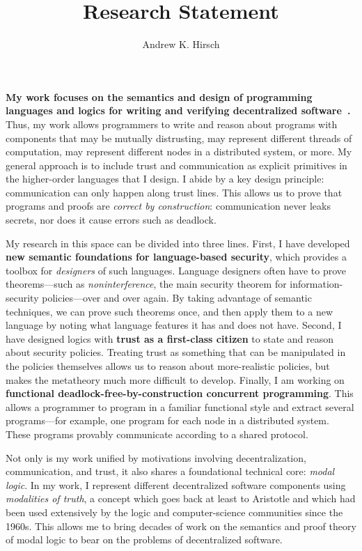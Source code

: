\documentclass{article}
\author{Andrew K. Hirsch}
\title{Research Statement}
\date{}
\theoremstyle{definition}
\begin{document}
\maketitle

\textbf{My work focuses on the semantics and design of programming languages and logics for writing and verifying decentralized software~\citep{SilverHHCZ22,MenzHLG22,HirschG22,HirschC21,HirschACAT20,HirschT18,HirschC13}.}
Thus, my work allows programmers to write and reason about programs with components that may be mutually distrusting, may represent different threads of computation, may represent different nodes in a distributed system, or more.
My general approach is to include trust and communication as explicit primitives in the higher-order languages that I design.
I abide by a key design principle: communication can only happen along trust lines.
This allows us to prove that programs and proofs are \emph{correct by construction}: communication never leaks secrets, nor does it cause errors such as deadlock.

My research in this space can be divided into three lines.
First, I have developed \textbf{new semantic foundations for language-based security}, which provides a toolbox for \emph{designers} of such languages.
Language designers often have to prove theorems---such as \emph{noninterference}, the main security theorem for information-security policies---over and over again.
By taking advantage of semantic techniques, we can prove such theorems once, and then apply them to a new language by noting what language features it has and does not have.
Second, I have designed logics with \textbf{trust as a first-class citizen} to state and reason about security policies.
Treating trust as something that can be manipulated in the policies themselves allows us to reason about more-realistic policies, but makes the metatheory much more difficult to develop.
Finally, I am working on \textbf{functional deadlock-free-by-construction concurrent programming}.
This allows a programmer to program in a familiar functional style and extract several programs---for example, one program for each node in a distributed system.
These programs provably communicate according to a shared protocol.

Not only is my work unified by motivations involving decentralization, communication, and trust, it also shares a foundational technical core: \emph{modal logic}.
In my work, I represent different decentralized software components using \emph{modalities of truth}, a concept which goes back at least to Aristotle and which had been used extensively by the logic and computer-science communities since the 1960s.
This allows me to bring decades of work on the semantics and proof theory of modal logic to bear on the problems of decentralized software.
\end{document}
